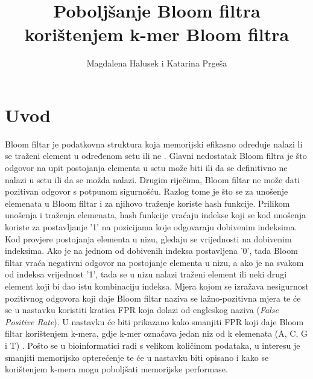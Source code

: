 \documentclass[times, utf8, seminar, numeric]{fer}
\begin{document}

\title{Poboljšanje Bloom filtra korištenjem k-mer Bloom filtra}

\author{Magdalena Halusek i Katarina Prgeša}


\maketitle

\tableofcontents

\chapter{Uvod}
Bloom filtar je podatkovna struktura koja memorijski efikasno određuje nalazi li
se traženi element u određenom setu ili ne \cite{bloom_filter}. Glavni nedostatak
Bloom filtra je što odgovor na upit postojanja elementa u setu može biti ili da
se definitivno ne nalazi u setu ili da se možda nalazi. Drugim riječima, Bloom
filtar ne može dati pozitivan odgovor s potpunom sigurnošću. Razlog tome je što
se za unošenje elemenata u Bloom filtar i za njihovo traženje koriste hash
funkcije. Prilikom unošenja i traženja elemenata, hash funkcije vraćaju indekse
koji se kod unošenja koriste za postavljanje '1' na pozicijama koje
odgovaraju dobivenim indeksima. Kod provjere postojanja elementa u nizu, gledaju
se vrijednosti na dobivenim indeksima. Ako je na jednom od dobivenih indeksa
postavljena '0', tada Bloom filtar vraća negativni odgovor na postojanje elementa
u nizu, a ako je na svakom od indeksa vrijednost '1', tada se u nizu nalazi
traženi element ili neki drugi element koji bi dao istu kombinaciju indeksa.
Mjera kojom se izražava nesigurnost pozitivnog odgovora koji daje Bloom filtar
naziva se lažno-pozitivna mjera te će se u nastavku koristiti kratica FPR koja
dolazi od engleskog naziva (\textit{False Positive Rate}).
U nastavku će biti prikazano kako smanjiti FPR koji daje Bloom filtar korištenjem
k-mera, gdje k-mer označava jedan niz od k elemenata (A, C, G i T) \cite{kmer}.
Pošto se u bioinformatici radi s velikom količinom podataka, u interesu je
smanjiti memorijsko opterećenje te će u nastavku biti opisano i kako se korištenjem
k-mera mogu poboljšati memorijske performase.
\end{document}
